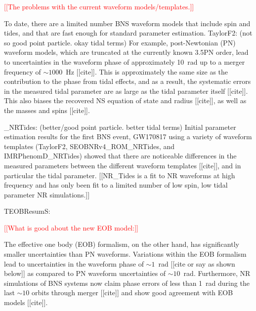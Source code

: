 \documentclass[prd,aps,letter,twocolumn,floatfix,notitlepage,nofootinbib]{revtex4-1}
\newcommand{\red}[1]{\textcolor{red}{#1}}
\begin{document}


\red{[[The problems with the current waveform models/templates.]]}

To date, there are a limited number BNS waveform models that include spin and tides, and that are fast enough for standard parameter estimation.  
TaylorF2: (not so good point particle. okay tidal terms)
For example, post-Newtonian (PN) waveform models, which are truncated at the currently known 3.5PN order, lead to uncertainties in the waveform phase of approximately 10~rad up to a merger frequency of $\sim 1000$~Hz [[cite]]. This is approximately the same size as the contribution to the phase from tidal effects, and as a result, the systematic errors in the measured tidal parameter are as large as the tidal parameter itself [[cite]]. This also biases the recovered NS equation of state and radius [[cite]], as well as the masses and spins [[cite]].

\*\_NRTides: (better/good point particle. better tidal terms)
Initial parameter estimation results for the first BNS event, GW170817 using a variety of waveform templates (TaylorF2, SEOBNRv4\_ROM\_NRTides, and IMRPhenomD\_NRTides) showed that there are noticeable differences in the measured parameters between the different waveform templates [[cite]], and in particular the tidal parameter. [[NR\_Tides is a fit to NR waveforms at high frequency and has only been fit to a limited number of low spin, low tidal parameter NR simulations.]]

TEOBResumS:

\red{[[What is good about the new EOB model:]]}

The effective one body (EOB) formalism, on the other hand, has significantly smaller uncertainties than PN waveforms. Variations within the EOB formalism lead to uncertainties in the waveform phase of $\sim 1$~rad [[cite or say as shown below]] as compared to PN waveform uncertainties of $\sim 10$~rad. Furthermore, NR simulations of BNS systems now claim phase errors of less than 1~rad during the last $\sim 10$ orbits through merger [[cite]] and show good agreement with EOB models [[cite]]. 
\end{document}
